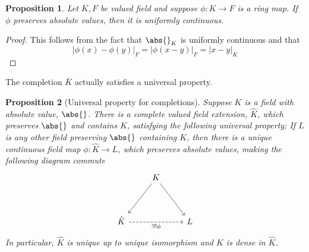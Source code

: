 \documentclass{article}
\newtheorem{proposition}{Proposition}[section]
\begin{document}
\begin{proposition}
    Let $K,F$ be valued field and suppose $\phi : K \to F$ is a ring map. If $\phi$ preserves absolute values, then it is uniformly continuous. 
\end{proposition}

\begin{proof}
    This follows from the fact that $\abs{}_K$ is uniformly continuous and that
    $$|\phi(x) - \phi(y)|_F = |\phi(x-y)|_F = |x-y|_K$$ 
\end{proof}


The completion $\bar K$ actually satisfies a universal property.

\begin{proposition}[Universal property for completions]
    Suppose $K$ is a field with absolute value, $\abs{}$. There is a complete valued field extension, $\hat K$, which preserves $\abs{}$ and contains $K$, satisfying the following universal property; If $L$ is any other field preserving $\abs{}$ containing $K$, then there is a unique continuous field map $\phi : \hat K \to L$, which preserves absolute values, making the following diagram commute
    \[\begin{tikzcd}
        & K \\
        \\
        \hat K && L
        \arrow["{\exists! \phi}"', dashed, from=3-1, to=3-3]
        \arrow[from=1-2, to=3-1]
        \arrow[from=1-2, to=3-3]
    \end{tikzcd}\]
    In particular, $\hat K$ is unique up to unique isomorphism and $K$ is dense in $\hat K$.
\end{proposition}
\end{document}
